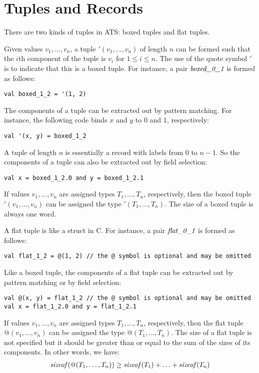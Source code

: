 \section{Tuples and Records}
There are two kinds of tuples in ATS: boxed tuples and flat tuples.

Given values $v_1,\ldots, v_n$, a tuple $'(v_1,\ldots,v_n)$ of length $n$
can be formed such that the $i$th component of the tuple is $v_i$ for
$1\leq i\leq n$. The use of the quote symbol $'$ is to indicate that this
is a boxed tuple.  For instance, a pair $\mbox{\it boxed\_0\_1}$ is
formed as follows:
\begin{verbatim}
val boxed_1_2 = '(1, 2)
\end{verbatim}
The components of a tuple can be extracted out by pattern matching. For
instance, the following code binds $x$ and $y$ to $0$ and $1$,
respectively:
\begin{verbatim}
val '(x, y) = boxed_1_2
\end{verbatim}
A tuple of length $n$ is essentially a record with labels from $0$ to
$n-1$. So the components of a tuple can also be extracted out by field
selection:
\begin{verbatim}
val x = boxed_1_2.0 and y = boxed_1_2.1
\end{verbatim}
If values $v_1,\ldots,v_n$ are assigned types $T_1,\ldots,T_n$,
respectively, then the boxed tuple $'(v_1,\ldots,v_n)$ can be assigned the type
$'(T_1,\ldots,T_n)$. The size of a boxed tuple is always one word.

A flat tuple is like a struct in C. For instance, a pair $\mbox{\it
flat\_0\_1}$ is formed as follows:
\begin{verbatim}
val flat_1_2 = @(1, 2) // the @ symbol is optional and may be omitted
\end{verbatim}
Like a boxed tuple, the components of a flat tuple can be extracted out
by pattern matching or by field selection:
\begin{verbatim}
val @(x, y) = flat_1_2 // the @ symbol is optional and may be omitted
val x = flat_1_2.0 and y = flat_1_2.1
\end{verbatim}
If values $v_1,\ldots,v_n$ are assigned types $T_1,\ldots,T_n$,
respectively, then the flat tuple $@(v_1,\ldots,v_n)$ can be assigned the
type $@(T_1,\ldots,T_n)$. The size of a flat tuple is not specified but it
should be greater than or equal to the sum of the sizes of
its components. In other words, we have:
\[\begin{array}{l}
{\it sizeof}(@(T_1,\ldots,T_n)) \geq {\it sizeof}(T_1) + \ldots + {\it sizeof}(T_n)
\end{array}\]

